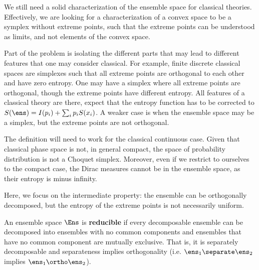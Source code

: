 {We still need a solid characterization of the ensemble space for classical theories. Effectively, we are looking for a characterization of a convex space to be a symplex without extreme points, such that the extreme points can be understood as limits, and not elements of the convex space.}

Part of the problem is isolating the different parts that may lead to different features that one may consider classical. For example, finite discrete classical spaces are simplexes such that all extreme points are orthogonal to each other and have zero entropy. One may have a simplex where all extreme points are orthogonal, though the extreme points have different entropy. All features of a classical theory are there, expect that the entropy function has to be corrected to $S(\ens) = I(p_i) + \sum_i p_i S(x_i)$. A weaker case is when the ensemble space may be a simplex, but the extreme points are not orthogonal.

The definition will need to work for the classical continuous case. Given that classical phase space is not, in general compact, the space of probability distribution is not a Choquet simplex. Moreover, even if we restrict to ourselves to the compact case, the Dirac measures cannot be in the ensemble space, as their entropy is minus infinity. 

Here, we focus on the intermediate property: the ensemble can be orthogonally decomposed, but the entropy of the extreme points is not necessarily uniform. 

\begin{defn}
	An ensemble space $\Ens$ is \textbf{reducible} if every decomposable ensemble can be decomposed into ensembles with no common components and ensembles that have no common component are mutually exclusive. That is, it is separately decomposable and separateness implies orthogonality (i.e. $\ens_1 \separate \ens_2$ implies $\ens_1 \ortho \ens_2$).
\end{defn}

